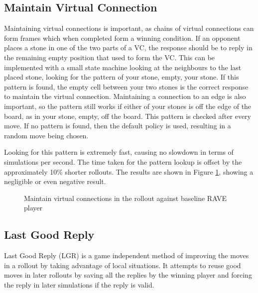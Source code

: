 \subsection{Maintain Virtual Connection}

Maintaining virtual connections is important, as chains of virtual connections can form frames which when completed form a winning condition. If an opponent places a stone in one of the two parts of a VC, the response should be to reply in the remaining empty position that used to form the VC. This can be implemented with a small state machine looking at the neighbours to the last placed stone, looking for the pattern of your stone, empty, your stone. If this pattern is found, the empty cell between your two stones is the correct response to maintain the virtual connection. Maintaining a connection to an edge is also important, so the pattern still works if either of your stones is off the edge of the board, as in your stone, empty, off the board. This pattern is checked after every move. If no pattern is found, then the default policy is used, resulting in a random move being chosen.

Looking for this pattern is extremely fast, causing no slowdown in terms of simulations per second. The time taken for the pattern lookup is offset by the approximately 10\% shorter rollouts. The results are shown in Figure \ref{fig:maintainvcrollout}, showing a negligible or even negative result.

\begin{figure}
	\centering
{}
	\caption{Maintain virtual connections in the rollout against baseline RAVE player}
	\label{fig:maintainvcrollout}
\end{figure}

\subsection{Last Good Reply}

Last Good Reply (LGR) is a game independent method of improving the moves in a rollout by taking advantage of local situations. It attempts to reuse good moves in later rollouts by saving all the replies by the winning player and forcing the reply in later simulations if the reply is valid.

